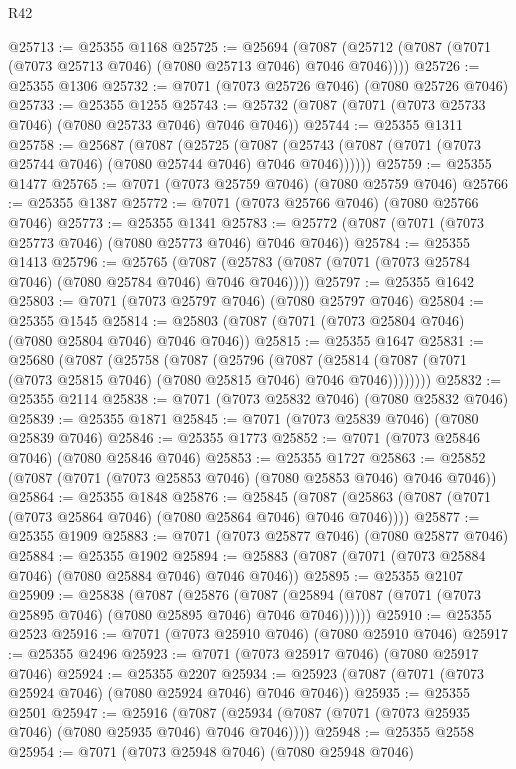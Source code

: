 \begin{lexlean}{R42}
\begin{coremodule}
{@25713 := @25355 @1168
@25725 := @25694
    (@7087 (@25712 (@7087 (@7071 (@7073 @25713 @7046) (@7080 @25713 @7046) @7046 @7046))))
@25726 := @25355 @1306
@25732 := @7071 (@7073 @25726 @7046) (@7080 @25726 @7046)
@25733 := @25355 @1255
@25743 := @25732 (@7087 (@7071 (@7073 @25733 @7046) (@7080 @25733 @7046) @7046 @7046))
@25744 := @25355 @1311
@25758 := @25687
    (@7087
      (@25725
        (@7087 (@25743 (@7087 (@7071 (@7073 @25744 @7046) (@7080 @25744 @7046) @7046 @7046))))))
@25759 := @25355 @1477
@25765 := @7071 (@7073 @25759 @7046) (@7080 @25759 @7046)
@25766 := @25355 @1387
@25772 := @7071 (@7073 @25766 @7046) (@7080 @25766 @7046)
@25773 := @25355 @1341
@25783 := @25772 (@7087 (@7071 (@7073 @25773 @7046) (@7080 @25773 @7046) @7046 @7046))
@25784 := @25355 @1413
@25796 := @25765
    (@7087 (@25783 (@7087 (@7071 (@7073 @25784 @7046) (@7080 @25784 @7046) @7046 @7046))))
@25797 := @25355 @1642
@25803 := @7071 (@7073 @25797 @7046) (@7080 @25797 @7046)
@25804 := @25355 @1545
@25814 := @25803 (@7087 (@7071 (@7073 @25804 @7046) (@7080 @25804 @7046) @7046 @7046))
@25815 := @25355 @1647
@25831 := @25680
    (@7087
      (@25758
        (@7087
          (@25796
            (@7087
              (@25814 (@7087 (@7071 (@7073 @25815 @7046) (@7080 @25815 @7046) @7046 @7046))))))))
@25832 := @25355 @2114
@25838 := @7071 (@7073 @25832 @7046) (@7080 @25832 @7046)
@25839 := @25355 @1871
@25845 := @7071 (@7073 @25839 @7046) (@7080 @25839 @7046)
@25846 := @25355 @1773
@25852 := @7071 (@7073 @25846 @7046) (@7080 @25846 @7046)
@25853 := @25355 @1727
@25863 := @25852 (@7087 (@7071 (@7073 @25853 @7046) (@7080 @25853 @7046) @7046 @7046))
@25864 := @25355 @1848
@25876 := @25845
    (@7087 (@25863 (@7087 (@7071 (@7073 @25864 @7046) (@7080 @25864 @7046) @7046 @7046))))
@25877 := @25355 @1909
@25883 := @7071 (@7073 @25877 @7046) (@7080 @25877 @7046)
@25884 := @25355 @1902
@25894 := @25883 (@7087 (@7071 (@7073 @25884 @7046) (@7080 @25884 @7046) @7046 @7046))
@25895 := @25355 @2107
@25909 := @25838
    (@7087
      (@25876
        (@7087 (@25894 (@7087 (@7071 (@7073 @25895 @7046) (@7080 @25895 @7046) @7046 @7046))))))
@25910 := @25355 @2523
@25916 := @7071 (@7073 @25910 @7046) (@7080 @25910 @7046)
@25917 := @25355 @2496
@25923 := @7071 (@7073 @25917 @7046) (@7080 @25917 @7046)
@25924 := @25355 @2207
@25934 := @25923 (@7087 (@7071 (@7073 @25924 @7046) (@7080 @25924 @7046) @7046 @7046))
@25935 := @25355 @2501
@25947 := @25916
    (@7087 (@25934 (@7087 (@7071 (@7073 @25935 @7046) (@7080 @25935 @7046) @7046 @7046))))
@25948 := @25355 @2558
@25954 := @7071 (@7073 @25948 @7046) (@7080 @25948 @7046)
}
\end{coremodule}
\end{lexlean}
